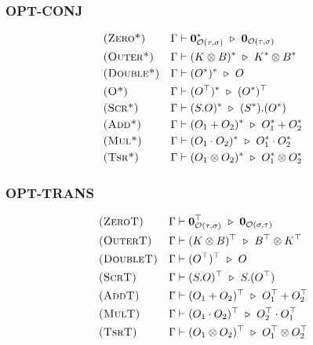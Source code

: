 \subsubsection*{\textsf{OPT-CONJ}}
\begin{align*}
  & \textsc{(Zero*)} && \Gamma \vdash \mathbf{0}_{\mathcal{O}(\tau, \sigma)}^* \ \triangleright\  \mathbf{0}_{\mathcal{O}(\tau, \sigma)} \\
  & \textsc{(Outer*)} && \Gamma \vdash (K \otimes B)^* \ \triangleright\  K^* \otimes B^* \\
  & \textsc{(Double*)} && \Gamma \vdash (O^*)^* \ \triangleright\  O \\
  & \textsc{(O*)} && \Gamma \vdash (O^\top)^* \ \triangleright\ (O^*)^\top \\
  & \textsc{(Scr*)} && \Gamma \vdash (S.O)^* \ \triangleright\  (S^*).(O^*) \\
  & \textsc{(Add*)} && \Gamma \vdash (O_1 + O_2)^* \ \triangleright\  O_1^* + O_2^* \\
  & \textsc{(Mul*)} && \Gamma \vdash (O_1 \cdot O_2)^* \ \triangleright\  O_1^* \cdot O_2^* \\
  & \textsc{(Tsr*)} && \Gamma \vdash (O_1 \otimes O_2)^* \ \triangleright\  O_1^* \otimes O_2^*
\end{align*}

\subsubsection*{\textsf{OPT-TRANS}}
\begin{align*}
  & \textsc{(ZeroT)} && \Gamma \vdash \mathbf{0}_{\mathcal{O}(\tau, \sigma)}^\top \ \triangleright\  \mathbf{0}_{\mathcal{O}(\sigma, \tau)} \\
  & \textsc{(OuterT)} && \Gamma \vdash (K \otimes B)^\top \ \triangleright\  B^\top \otimes K^\top \\
  & \textsc{(DoubleT)} && \Gamma \vdash (O^\top)^\top \ \triangleright\  O \\
  & \textsc{(ScrT)} && \Gamma \vdash (S.O)^\top \ \triangleright\  S.(O^\top) \\
  & \textsc{(AddT)} && \Gamma \vdash (O_1 + O_2)^\top \ \triangleright\  O_1^\top + O_2^\top\\
  & \textsc{(MulT)} && \Gamma \vdash (O_1 \cdot O_2)^\top \ \triangleright\  O_2^\top \cdot O_1^\top \\
  & \textsc{(TsrT)} && \Gamma \vdash (O_1 \otimes O_2)^\top \ \triangleright\  O_1^\top \otimes O_2^\top
\end{align*}

